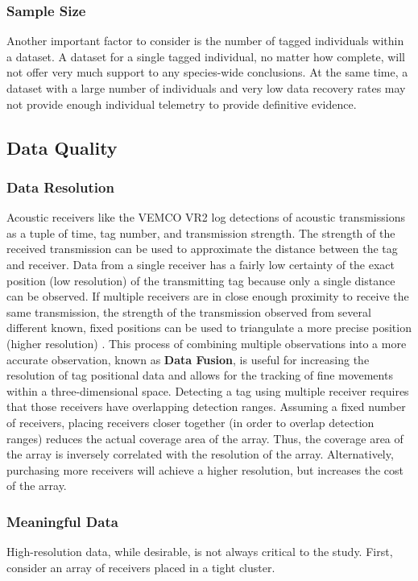 \subsubsection{Sample Size}
\label{sampleSize}
Another important factor to consider is the number of tagged individuals within a dataset.  A dataset for a single tagged individual, no matter how complete, will not offer very much support to any species-wide conclusions.  At the same time, a dataset with a large number of individuals and very low data recovery rates may not provide enough individual telemetry to provide definitive evidence.

\subsection{Data Quality}
\label{dataQuality}
\subsubsection{Data Resolution}
\label{dataResolution}
\label{dataFusion}
Acoustic receivers like the VEMCO VR2 log detections of acoustic transmissions as a tuple of time, tag number, and transmission strength.  The strength of the received transmission can be used to approximate the distance between the tag and receiver.  Data from a single receiver has a fairly low certainty of the exact position (low resolution) of the transmitting tag because only a single distance can be observed.  If multiple receivers are in close enough proximity to receive the same transmission, the strength of the transmission observed from several different known, fixed positions can be used to triangulate a more precise position (higher resolution) \cite{EstimatingIndividual}\cite{statespacemodel} .  This process of combining multiple observations into a more accurate observation, known as \textbf{Data Fusion}, is useful for increasing the resolution of tag positional data and allows for the tracking of fine movements within a three-dimensional space.  Detecting a tag using multiple receiver requires that those receivers have overlapping detection ranges\cite{Zhaohui2008}.  Assuming a fixed number of receivers, placing receivers closer together (in order to overlap detection ranges) reduces the actual coverage area of the array.  Thus, the coverage area of the array is inversely correlated with the resolution of the array.  Alternatively, purchasing more receivers will achieve a higher resolution, but increases the cost of the array.


\subsubsection{Meaningful Data}
\label{meaningfulData}
High-resolution data, while desirable, is not always critical to the study.  First, consider an array of receivers placed in a tight cluster.

